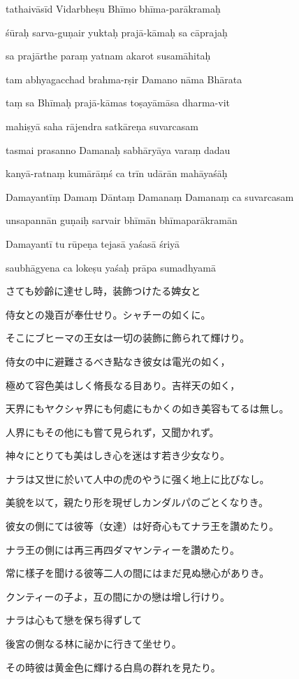 tathaivāsīd Vidarbheṣu Bhīmo bhīma-parākramaḥ \da

śūraḥ sarva-guṇair yuktaḥ prajā-kāmaḥ sa cāprajaḥ \dd

sa prajārthe paraṃ yatnam akarot susamāhitaḥ \da

tam abhyagacchad brahma-rṣir Damano nāma Bhārata \dd

taṃ sa Bhīmaḥ prajā-kāmas toṣayāmāsa dharma-vit \da

mahiṣyā saha rājendra satkāreṇa suvarcasam \dd

tasmai prasanno Damanaḥ sabhāryāya varaṃ dadau \da

kanyā-ratnaṃ kumārāṃś ca trīn udārān mahāyaśāḥ \dd

Damayantīṃ Damaṃ Dāntaṃ Damanaṃ Damanaṃ ca suvarcasam \da

unsapannān guṇaiḥ sarvair bhīmān bhīmaparākramān \dd

Damayantī tu rūpeṇa tejasā yaśasā śriyā \da

saubhāgyena ca lokeṣu yaśaḥ prāpa sumadhyamā \dd

\newpage

さても妙齡に達せし時，装飾つけたる婢女と

侍女との幾百が奉仕せり。シャチーの如くに。

そこにブヒーマの王女は一切の装飾に飾られて輝けり。

侍女の中に避難さるべき點なき彼女は電光の如く，

極めて容色美はしく脩長なる目あり。吉祥天の如く，

天界にもヤクシャ界にも何處にもかくの如き美容もてるは無し。

人界にもその他にも嘗て見られず，又聞かれず。

神々にとりても美はしき心を迷はす若き少女なり。

ナラは又世に於いて人中の虎のやうに强く地上に比びなし。

美貌を以て，親たり形を現ぜしカンダルパのごとくなりき。

彼女の側にては彼等（女達）は好奇心もてナラ王を讚めたり。

ナラ王の側には再三再四ダマヤンティーを讚めたり。

常に樣子を聞ける彼等二人の間にはまだ見ぬ戀心がありき。

クンティーの子よ，互の間にかの戀は增し行けり。

ナラは心もて戀を保ち得ずして

後宮の側なる林に祕かに行きて坐せり。

その時彼は黄金色に輝ける白鳥の群れを見たり。

